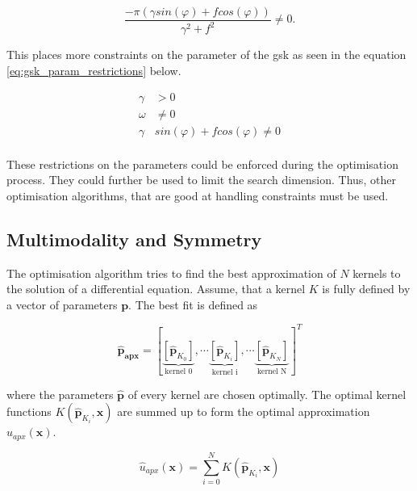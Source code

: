 \documentclass[./\jobname.tex]{subfiles}
\begin{document}
\begin{equation}
	\frac{-\pi (\gamma sin(\varphi) + f cos(\varphi))}{\gamma^2 + f^2} \neq 0.
\end{equation}

This places more constraints on the parameter of the \gls{gsk} as seen in the equation \eqref{eq:gsk_param_restrictions} below. 

\begin{equation}
\label{eq:gsk_param_restrictions}
	\begin{split}
	\gamma & > 0 \\
	\omega & \neq 0 \\
	\gamma & sin(\varphi) + f cos(\varphi) \neq 0 \\
	\end{split}
\end{equation}

These restrictions on the parameters could be enforced during the optimisation process. They could further be used to limit the search dimension. Thus, other optimisation algorithms, that are good at handling constraints must be used. 

\subsection{Multimodality and Symmetry}
\label{chap:multimodality_and_symmetry}

The optimisation algorithm tries to find the best approximation of $N$ kernels to the solution of a differential equation. Assume, that a kernel $K$ is fully defined by a vector of parameters $\mathbf{p}$. The best fit is defined as 

\begin{equation}
\mathbf{\hat{p}_{apx}} = \left[\underbrace{\left[ \mathbf{\hat{p}}_{K_0} \right] }_{\text{kernel 0}}, \cdots \underbrace{\left[ \mathbf{\hat{p}}_{K_i} \right] }_{\text{kernel i}}, \cdots \underbrace{\left[ \mathbf{\hat{p}}_{K_N} \right]}_{\text{kernel N}} \right]^T
\end{equation}

where the parameters $\mathbf{\hat{p}}$ of every kernel are chosen optimally. The optimal kernel functions $K(\mathbf{\hat{p}}_{K_i}, \mathbf{x})$ are summed up to form the optimal approximation $\hat{u}_{apx}(\mathbf{x})$. 

\begin{equation}
\label{eq:uapx_kernel_sum}
\hat{u}_{apx}(\mathbf{x}) = \sum_{i=0}^{N} K(\mathbf{\hat{p}}_{K_i}, \mathbf{x})
\end{equation}
\end{document}
